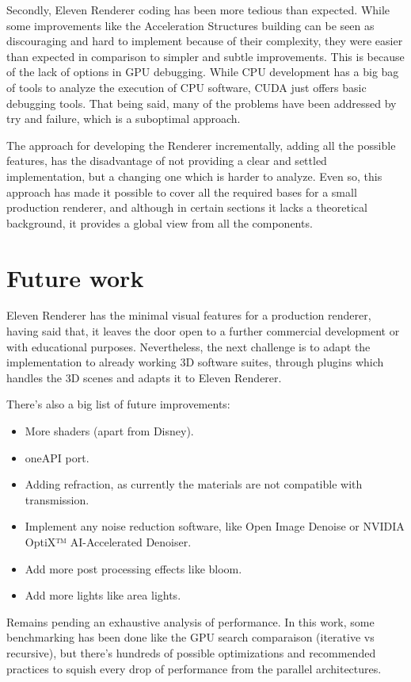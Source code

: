 Secondly, Eleven Renderer coding has been more tedious than expected. While some improvements like the Acceleration Structures building can be seen as discouraging and hard to implement because of their complexity, they were easier than expected in comparison to simpler and subtle improvements. This is because of the lack of options in GPU debugging. While CPU development has a big bag of tools to analyze the execution of CPU software, CUDA just offers basic debugging tools. That being said, many of the problems have been addressed by try and failure, which is a suboptimal approach.

The approach for developing the Renderer incrementally, adding all the possible features, has the disadvantage of not providing a clear and settled implementation, but a changing one which is harder to analyze. Even so, this approach has made it possible to cover all the required bases for a small production renderer, and although in certain sections it lacks a theoretical background, it provides a global view from all the components.

\section{Future work}

Eleven Renderer has the minimal visual features for a production renderer, having said that, it leaves the door open to a further commercial development or with educational purposes. Nevertheless, the next challenge is to adapt the implementation to already working 3D software suites, through plugins which handles the 3D scenes and adapts it to Eleven Renderer.

There's also a big list of future improvements:

\begin{itemize}
	
	\item More shaders (apart from Disney).
	\item oneAPI port.
	\item Adding refraction, as currently the materials are not compatible with transmission.
	\item Implement any noise reduction software, like Open Image Denoise or NVIDIA OptiX™ AI-Accelerated Denoiser.
	\item Add more post processing effects like bloom.
	\item Add more lights like area lights.
	
\end{itemize}

Remains pending an exhaustive analysis of performance. In this work, some benchmarking has been done like the GPU search comparaison (iterative vs recursive), but there's hundreds of possible optimizations and recommended practices to squish every drop of performance from the parallel architectures.
